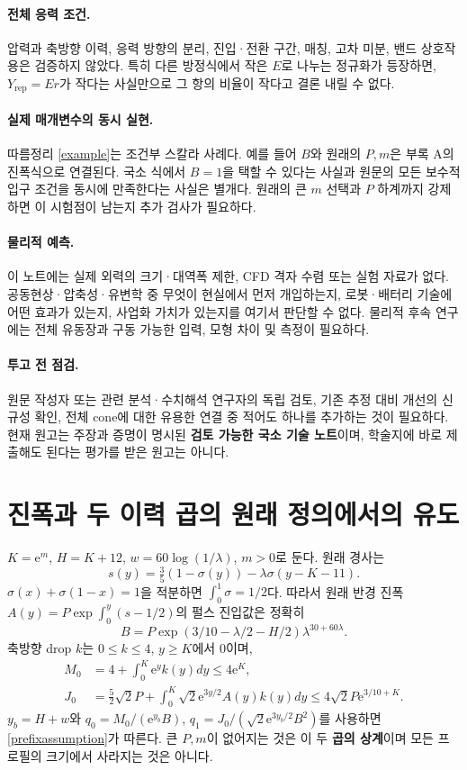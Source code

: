 \documentclass[11pt,a4paper]{article}
\theoremstyle{definition}
\theoremstyle{remark}\newtheorem{remark}[theorem]{주의}
\newcommand{\e}{\mathrm e}
\newcommand{\rep}{\mathrm{rep}}
\begin{document}
\paragraph{전체 응력 조건.}
압력과 축방향 이력, 응력 방향의 분리, 진입·전환 구간, 매칭, 고차 미분, 밴드 상호작용은 검증하지 않았다. 특히 다른 방정식에서 작은 $E$로 나누는 정규화가 등장하면, $Y_\rep=Er$가 작다는 사실만으로 그 항의 비율이 작다고 결론 내릴 수 없다.

\paragraph{실제 매개변수의 동시 실현.}
따름정리 \ref{example}는 조건부 스칼라 사례다. 예를 들어 $B$와 원래의 $P,m$은 부록 A의 진폭식으로 연결된다. 국소 식에서 $B=1$을 택할 수 있다는 사실과 원문의 모든 보수적 입구 조건을 동시에 만족한다는 사실은 별개다. 원래의 큰 $m$ 선택과 $P$ 하계까지 강제하면 이 시험점이 남는지 추가 검사가 필요하다.

\paragraph{물리적 예측.}
이 노트에는 실제 외력의 크기·대역폭 제한, CFD 격자 수렴 또는 실험 자료가 없다. 공동현상·압축성·유변학 중 무엇이 현실에서 먼저 개입하는지, 로봇·배터리 기술에 어떤 효과가 있는지, 사업화 가치가 있는지를 여기서 판단할 수 없다. 물리적 후속 연구에는 전체 유동장과 구동 가능한 입력, 모형 차이 및 측정이 필요하다.

\paragraph{투고 전 점검.}
원문 작성자 또는 관련 분석·수치해석 연구자의 독립 검토, 기존 추정 대비 개선의 신규성 확인, 전체 cone에 대한 유용한 연결 중 적어도 하나를 추가하는 것이 필요하다. 현재 원고는 주장과 증명이 명시된 \textbf{검토 가능한 국소 기술 노트}이며, 학술지에 바로 제출해도 된다는 평가를 받은 원고는 아니다.

\appendix
\section{진폭과 두 이력 곱의 원래 정의에서의 유도}
$K=\e^m$, $H=K+12$, $w=60\log(1/\lambda)$, $m>0$로 둔다. 원래 경사는
\begin{equation}
 s(y)=\tfrac35(1-\sigma(y))-\lambda\sigma(y-K-11).
\end{equation}
$\sigma(x)+\sigma(1-x)=1$을 적분하면 $\int_0^1\sigma=1/2$다. 따라서 원래 반경 진폭 $A(y)=P\exp\int_0^y(s-1/2)$의 펄스 진입값은 정확히
\begin{equation}\label{Bexact}
 B=P\exp(3/10-\lambda/2-H/2)\lambda^{30+60\lambda}.
\end{equation}
축방향 drop $k$는 $0\le k\le4$, $y\ge K$에서 0이며,
\begin{align}
 M_0&=4+\int_0^K\e^yk(y)dy\le4\e^K,\\
 J_0&=\tfrac52\sqrt2P+\int_0^K\sqrt2\e^{3y/2}A(y)k(y)dy
      \le4\sqrt2P\e^{3/10+K}.
\end{align}
$y_b=H+w$와
$q_0=M_0/(\e^{y_b}B)$,
$q_1=J_0/(\sqrt2\e^{3y_b/2}B^2)$를 사용하면 \eqref{prefixassumption}가 따른다. 큰 $P,m$이 없어지는 것은 이 두 \textbf{곱의 상계}이며 모든 프로필의 크기에서 사라지는 것은 아니다.
\end{document}
